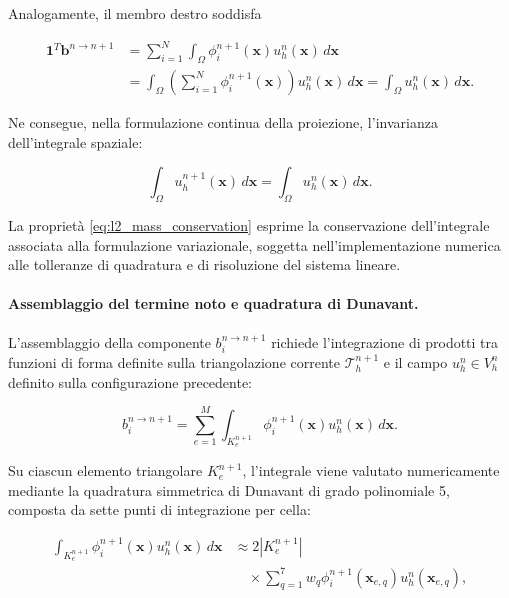 Analogamente, il membro destro soddisfa

\begin{equation}
\begin{aligned}
\mathbf{1}^T \mathbf{b}^{n\rightarrow n+1}
&=
\sum_{i=1}^{N}
\int_{\Omega}
\phi_i^{n+1}(\mathbf{x})u_h^n(\mathbf{x})
\,d\mathbf{x}
\\
&=
\int_{\Omega}
\left(
\sum_{i=1}^{N}
\phi_i^{n+1}(\mathbf{x})
\right)
u_h^n(\mathbf{x})
\,d\mathbf{x}
=
\int_{\Omega}
u_h^n(\mathbf{x})
\,d\mathbf{x}.
\end{aligned}
\label{eq:old_integral}
\end{equation}

Ne consegue, nella formulazione continua della proiezione, l'invarianza dell'integrale spaziale:

\begin{equation}
\int_{\Omega}
u_h^{n+1}(\mathbf{x})
\,d\mathbf{x}
=
\int_{\Omega}
u_h^n(\mathbf{x})
\,d\mathbf{x}.
\label{eq:l2_mass_conservation}
\end{equation}

La proprietà \eqref{eq:l2_mass_conservation} esprime la conservazione dell'integrale associata alla formulazione variazionale, soggetta nell'implementazione numerica alle tolleranze di quadratura e di risoluzione del sistema lineare.

\paragraph{Assemblaggio del termine noto e quadratura di Dunavant.}

L'assemblaggio della componente $b_i^{n\rightarrow n+1}$ richiede l'integrazione di prodotti tra funzioni di forma definite sulla triangolazione corrente $\mathcal{T}_h^{n+1}$ e il campo $u_h^n\in V_h^n$ definito sulla configurazione precedente:

\begin{equation}
b_i^{n\rightarrow n+1}
=
\sum_{e=1}^{M}
\int_{K_e^{n+1}}
\phi_i^{n+1}(\mathbf{x})
u_h^n(\mathbf{x})
\,d\mathbf{x}.
\label{eq:l2_rhs_assembly}
\end{equation}

Su ciascun elemento triangolare $K_e^{n+1}$, l'integrale viene valutato numericamente mediante la quadratura simmetrica di Dunavant di grado polinomiale 5, composta da sette punti di integrazione per cella:

\begin{equation}
\begin{aligned}
\int_{K_e^{n+1}}
\phi_i^{n+1}(\mathbf{x})
u_h^n(\mathbf{x})
\,d\mathbf{x}
&\approx
2|K_e^{n+1}|
\\
&\quad\times
\sum_{q=1}^{7}
w_q
\phi_i^{n+1}(\mathbf{x}_{e,q})
u_h^n(\mathbf{x}_{e,q}),
\end{aligned}
\label{eq:dunavant_quadrature}
\end{equation}

